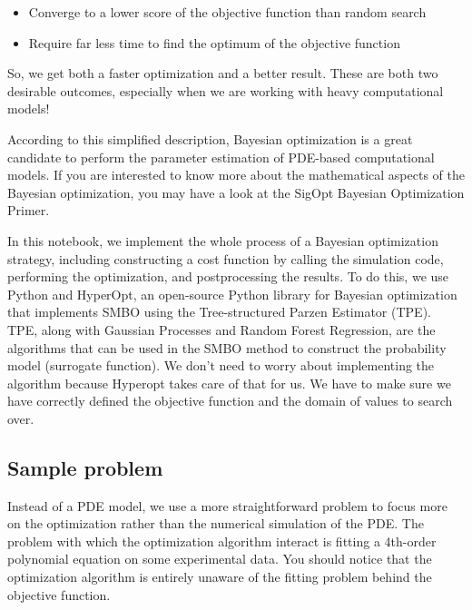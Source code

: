 \begin{subappendices}
\begin{itshape}
\begin{itemize}
\item
Converge to a lower score of the objective function than random search
\item
Require far less time to find the optimum of the objective function
\end{itemize}

So, we get both a faster optimization and a better result. These are both two desirable outcomes, especially when we are working with heavy computational models!
\end{itshape}

According to this simplified description, Bayesian optimization is a great candidate to perform the parameter estimation of PDE-based computational models. If you are interested to know more about the mathematical aspects of the Bayesian optimization, you may have a look at the SigOpt Bayesian Optimization Primer.

In this notebook, we implement the whole process of a Bayesian optimization strategy, including constructing a cost function by calling the simulation code, performing the optimization, and postprocessing the results. To do this, we use Python and HyperOpt, an open-source Python library for Bayesian optimization that implements SMBO using the Tree-structured Parzen Estimator (TPE). TPE, along with Gaussian Processes and Random Forest Regression, are the algorithms that can be used in the SMBO method to construct the probability model (surrogate function). We don't need to worry about implementing the algorithm because Hyperopt takes care of that for us. We have to make sure we have correctly defined the objective function and the domain of values to search over.

\subsection{Sample problem}

Instead of a PDE model, we use a more straightforward problem to focus more on the optimization rather than the numerical simulation of the PDE. The problem with which the optimization algorithm interact is fitting a 4th-order polynomial equation on some experimental data. You should notice that the optimization algorithm is entirely unaware of the fitting problem behind the objective function. 


\end{subappendices}
